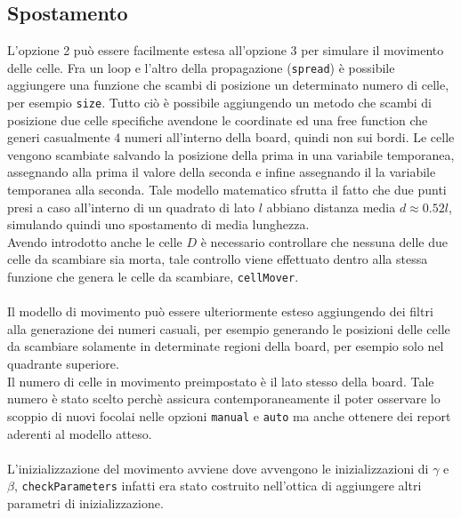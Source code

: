 \documentclass[a4paper]{article}
\begin{document}
\subsection{Spostamento}
L'opzione 2 può essere facilmente estesa all'opzione 3 per simulare il movimento delle celle. Fra un loop e l'altro della propagazione (\texttt{spread}) è possibile aggiungere una funzione che scambi di posizione un determinato numero di celle, per esempio \texttt{size}. Tutto ciò è possibile aggiungendo un metodo che scambi di posizione due celle specifiche avendone le coordinate ed una free function che generi casualmente 4 numeri all'interno della board, quindi non sui bordi. Le celle vengono scambiate salvando la posizione della prima in una variabile temporanea, assegnando alla prima il valore della seconda e infine assegnando il la variabile temporanea alla seconda. Tale modello matematico sfrutta il fatto che due punti presi a caso all'interno di un quadrato di lato $l$ abbiano distanza media $d \approx 0.52l$, simulando quindi uno spostamento di media lunghezza.\\
Avendo introdotto anche le celle $D$ è necessario controllare che nessuna delle due celle da scambiare sia morta, tale controllo viene effettuato dentro alla stessa funzione che genera le celle da scambiare, \texttt{cellMover}.\\ \\
Il modello di movimento può essere ulteriormente esteso aggiungendo dei filtri alla generazione dei numeri casuali, per esempio generando le posizioni delle celle da scambiare solamente in determinate regioni della board, per esempio solo nel quadrante superiore.\\
Il numero di celle in movimento preimpostato è il lato stesso della board. Tale numero è stato scelto perchè assicura contemporaneamente il poter osservare lo scoppio di nuovi focolai nelle opzioni \texttt{manual} e \texttt{auto} ma anche ottenere dei report aderenti al modello atteso. \\ \\
L'inizializzazione del movimento avviene dove avvengono le inizializzazioni di $\gamma$ e $\beta$, \texttt{checkParameters} infatti era stato costruito nell'ottica di aggiungere altri parametri di inizializzazione.\\
\end{document}
